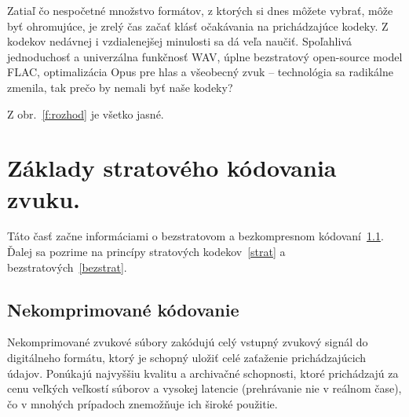 \documentclass[10pt,twoside,slovak,a4paper]{article}
\begin{document}
Zatiaľ čo nespočetné množstvo formátov, z ktorých si dnes môžete vybrať, môže byť ohromujúce, je zrelý čas začať klásť očakávania na prichádzajúce kodeky. Z kodekov nedávnej i vzdialenejšej minulosti sa dá veľa naučiť. Spoľahlivá jednoduchosť a univerzálna funkčnosť WAV, úplne bezstratový open-source model FLAC, optimalizácia Opus pre hlas a všeobecný zvuk – technológia sa radikálne zmenila, tak prečo by nemali byť naše kodeky?



Z obr.~\ref{f:rozhod} je všetko jasné. 




\section{Základy stratového kódovania zvuku.} \label{základy}

Táto časť začne informáciami o bezstratovom a bezkompresnom kódovaní~\ref{nekomp}. Ďalej sa pozrime na princípy stratových kodekov~\ref{strat} a bezstratových~\ref{bezstrat}.

\subsection{Nekomprimované kódovanie} \label{nekomp}

Nekomprimované zvukové súbory zakódujú celý vstupný zvukový signál do digitálneho formátu, ktorý je schopný uložiť celé zaťaženie prichádzajúcich údajov. Ponúkajú najvyššiu kvalitu a archivačné schopnosti, ktoré prichádzajú za cenu veľkých veľkostí súborov a vysokej latencie (prehrávanie nie v reálnom čase), čo v mnohých prípadoch znemožňuje ich široké použitie.
\end{document}

